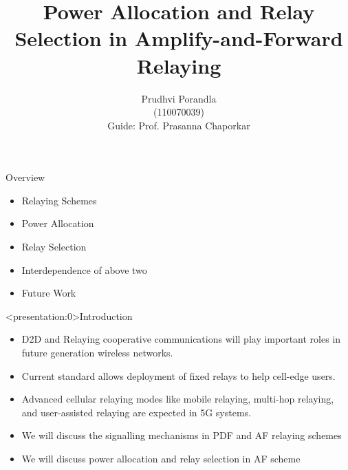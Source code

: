 \documentclass{beamer}
\title{Power Allocation and Relay Selection in
Amplify-and-Forward Relaying
}
\author{Prudhvi Porandla \\ \quad (110070039)\\
\vspace{2mm}
Guide: Prof. Prasanna Chaporkar}
\begin{document}
\begin{frame}
  \titlepage
\end{frame}

\begin{frame}{Overview}
  \begin{itemize}
  \item Relaying Schemes 
  \vspace{3mm}
  \item Power Allocation
  \vspace{3mm}
  \item Relay Selection 
  \vspace{3mm}
  \item Interdependence of above two
  \vspace{3mm}
  \item Future Work
  \end{itemize}
\end{frame}




\begin{frame}<presentation:0>{Introduction}
  \begin{itemize}
  \item D2D and Relaying cooperative communications will play important roles in future generation wireless networks.
  \vspace{0.5cm}
  \item Current standard allows deployment of fixed relays to help cell-edge users. 
  \vspace{0.5cm}
  \item Advanced cellular relaying modes like mobile relaying, multi-hop relaying, 
	  and user-assisted relaying are expected in 5G systems.
		  \vspace{0.5cm}
  \item We will discuss the signalling mechanisms in PDF and AF relaying schemes 
\item  We will discuss power allocation and relay selection in AF scheme
  \end{itemize}
\end{frame}
\end{document}
